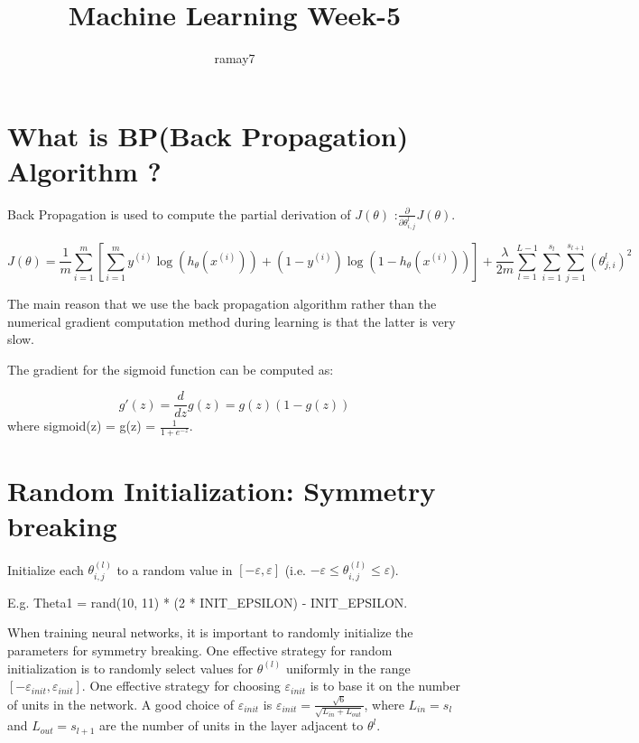 \documentclass[11pt]{article}
\begin{document}
	\title{Machine Learning Week-5}
	\author{ramay7}
	
	\maketitle %
	\tableofcontents %
	
	\section{What is BP(Back Propagation) Algorithm ?}
		Back Propagation is used to compute the partial derivation of $J(\theta)$ :$\frac{\partial}{\partial \theta_{i, j}^{l}} J(\theta)$.
			
		$$
		J(\theta) = \frac{1}{m} \sum_{i=1}^{m} \left[ \sum_{i=1}^{m}y^{(i)} \log(h_{\theta}(x^{(i)})) + (1-y^{(i)})\log (1-h_{\theta}(x^{(i)})) \right] + \frac{\lambda}{2m}\sum_{l=1}^{L-1}\sum_{i=1}^{s_{l}}\sum_{j=1}^{s_{l+1}} (\theta_{j,i}^{l})^2
		$$
		
		The main reason that we use the back propagation algorithm rather than the numerical gradient computation method during learning is that the latter is very slow.
		
		The gradient for the sigmoid function can be computed as:
		
		$$
		g'(z) = \frac{d}{dz}g(z) = g(z)(1-g(z))
		$$
		where sigmoid(z) = g(z) = $\frac{1}{1+e^{-z}}$.
		
	\section{Random Initialization: Symmetry breaking}
		Initialize each $\theta_{i,j}^{(l)}$ to a random value in $\left[ -\varepsilon, \varepsilon \right]$ (i.e. $-\varepsilon \leq \theta_{i,j}^{(l)} \leq \varepsilon$).
		
		E.g. Theta1 = rand(10, 11) * (2 * INIT\_EPSILON) - INIT\_EPSILON. 		
		
		When training neural networks, it is important to randomly initialize the parameters for symmetry breaking. One effective strategy for random initialization is to randomly select values for $\theta^{(l)}$ uniformly in the range $\left[ -\varepsilon_{init}, \varepsilon_{init} \right]$. One effective strategy for choosing $\varepsilon_{init}$ is to base it on the number of units in the network. A good choice of $\varepsilon_{init}$ is $\varepsilon_{init} = \frac{\sqrt{6}}{\sqrt{L_{in} + L_{out}}}$, where $L_{in} = s_{l}$ and $L_{out} = s_{l+1}$ are the number of units in the layer adjacent to $\theta^{l}$.
		
\end{document}
